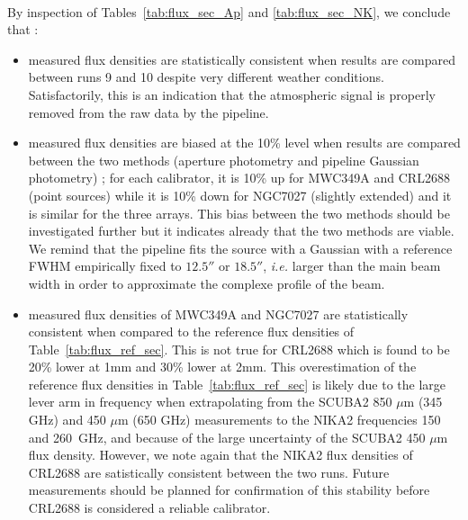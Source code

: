 \\

By inspection of Tables~\ref{tab:flux_sec_Ap} and \ref{tab:flux_sec_NK}, we conclude that :

\begin{itemize}
  
\item measured flux densities are statistically consistent when results are compared between runs 9 and 10 despite very different weather conditions.
Satisfactorily, this is an indication that the atmospheric signal is properly removed from the raw data by the pipeline.   


\item   measured flux densities are biased at the  10\% level when results are compared between the two methods
(aperture photometry and pipeline Gaussian photometry) ;
for each calibrator,  it is 10\% up for MWC349A and CRL2688 (point sources) while it is 10\% down
for NGC7027 (slightly extended) and it is similar for the three arrays.
This bias between the two methods should be investigated further but it indicates
already that the two methods are viable. We remind that the
pipeline fits the source with a Gaussian with a reference FWHM empirically fixed to $12.5''$ or $18.5''$, {\it i.e.} larger than the main beam width
in order to approximate the complexe profile of the beam.  

\item measured flux densities of MWC349A and NGC7027 are statistically consistent when compared to the reference flux densities of
Table~\ref{tab:flux_ref_sec}. This is not true
     for CRL2688 which is found to be 20\% lower at 1mm and 30\% lower at 2mm. This overestimation of the reference flux densities
      in Table~\ref{tab:flux_ref_sec}   is likely due to the large lever arm in frequency when extrapolating from
      the SCUBA2 850 $\mu$m (345 GHz) and 450 $\mu$m (650 GHz) measurements to the NIKA2 frequencies 150 and 260~GHz,
      and because of the large uncertainty of  the SCUBA2 450 $\mu$m flux density.
      However, we note again that the NIKA2 flux densities of CRL2688 are satistically consistent between the two runs.
      Future measurements should be planned
      for confirmation of this stability before CRL2688 is considered a reliable calibrator.

\end{itemize}

